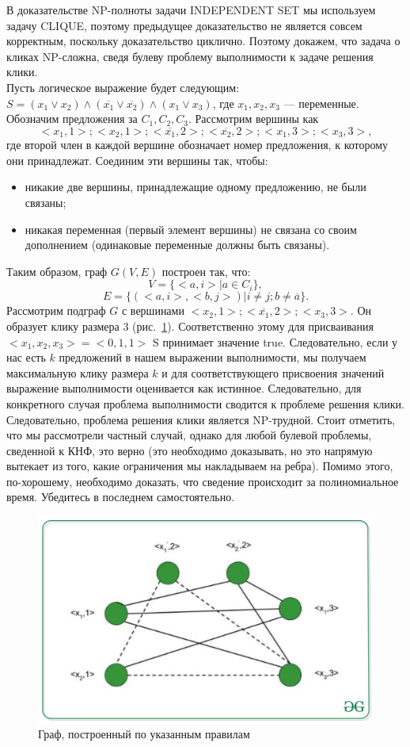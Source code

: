     \begin{Rem}
        В доказательстве NP-полноты задачи INDEPENDENT SET мы используем задачу CLIQUE, поэтому предыдущее доказательство не является совсем корректным, поскольку доказательство циклично. Поэтому докажем, что задача о кликах NP-сложна, сведя булеву проблему выполнимости к задаче решения клики.\\
        Пусть логическое выражение будет следующим: $S = (x_1 \vee x_2 ) \wedge (\overline{x_1} \vee \overline{x_2}) \wedge (x_1 \vee x_3 )$, где $x_1 , x_2 , x_3$ --- переменные. Обозначим предложения за $C_1, C_2, C_3$. Рассмотрим вершины как $$<x_1, 1>; <x_2, 1>; <\overline{x_1}, 2>; <\overline{x_2}, 2>; <x_1, 3>; <x_3, 3>,$$ где второй член в каждой вершине обозначает номер предложения, к которому они принадлежат. Соединим эти вершины так, чтобы:
        \begin{itemize}
            \item никакие две вершины, принадлежащие одному предложению, не были связаны;
            \item никакая переменная (первый элемент вершины) не связана со своим дополнением (одинаковые переменные должны быть связаны).
        \end{itemize}
        Таким образом, граф $G(V, E)$ построен так, что: $$V = \{<a, i> | a \in C_i\},$$ 
        $$E = \{(<a, i>, <b, j>) | i \neq j; b \neq \overline{a}\}.$$ 
        Рассмотрим подграф $G$ с вершинами $<x_2, 1>; <\overline{x_1}, 2>; <x_3, 3>$. Он образует клику размера 3 (рис.~\ref{ris:cliqueproblem}). Соответственно этому для присваивания  $<x_1 , x_2, x_3 > = <0, 1, 1>$ S принимает значение true. Следовательно, если у нас есть $k$ предложений в нашем выражении выполнимости, мы получаем максимальную клику размера $k$ и для соответствующего присвоения значений выражение выполнимости оценивается как истинное. Следовательно, для конкретного случая проблема выполнимости сводится к проблеме решения клики. Следовательно, проблема решения клики является NP-трудной. Стоит отметить, что мы рассмотрели частный случай, однако для любой булевой проблемы, сведенной к КНФ, это верно (это необходимо доказывать, но это напрямую вытекает из того, какие ограничения мы накладываем на ребра). Помимо этого, по-хорошему, необходимо доказать, что сведение происходит за полиномиальное время. Убедитесь в последнем самостоятельно.
    \end{Rem}
        \begin{figure}
            \centering
            \includegraphics[width=0.5\linewidth]{images/cliqueproblem.jpeg}
            \caption{Граф, построенный по указанным правилам}
            \label{ris:cliqueproblem}
        \end{figure}
